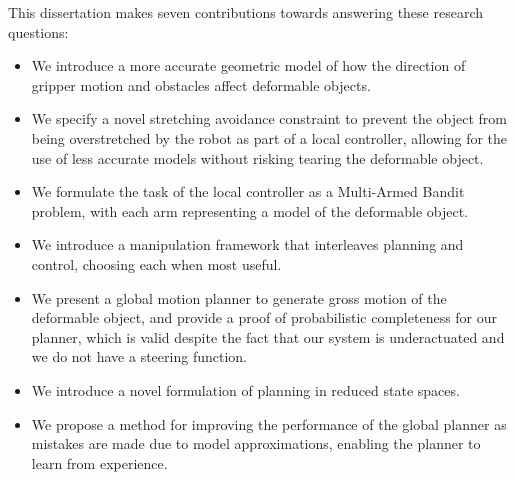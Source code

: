 This dissertation makes seven contributions towards answering these research questions:
\begin{itemize}
 \item We introduce a more accurate geometric model of how the direction of gripper motion and obstacles affect deformable objects.
 \item We specify a novel stretching avoidance constraint to prevent the object from being overstretched by the robot as part of a local controller, allowing for the use of less accurate models without risking tearing the deformable object.
 \item We formulate the task of the local controller as a Multi-Armed Bandit problem, with each arm representing a model of the deformable object.
 \item We introduce a manipulation framework that interleaves planning and control, choosing each when most useful.
 \item We present a global motion planner to generate gross motion of the deformable object, and provide a proof of probabilistic completeness for our planner, which is valid despite the fact that our system is underactuated and we do not have a steering function.
 \item We introduce a novel formulation of planning in reduced state spaces.
 \item We propose a method for improving the performance of the global planner as mistakes are made due to model approximations, enabling the planner to learn from experience.
\end{itemize}
